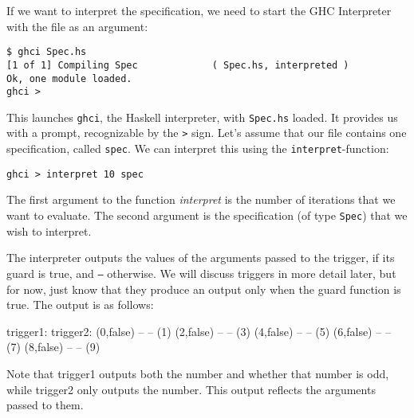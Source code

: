 If we want to interpret the specification, we need to start the GHC Interpreter with the file as an argument:
%
\begin{lstlisting}
$ ghci Spec.hs
[1 of 1] Compiling Spec             ( Spec.hs, interpreted )
Ok, one module loaded.
ghci > 
\end{lstlisting}
%
This launches \texttt{ghci}, the Haskell interpreter, with \texttt{Spec.hs}
loaded. It provides us with a prompt, recognizable by the \texttt{>} sign. Let's
assume that our file contains one specification, called \texttt{spec}. We can
interpret this using the \texttt{interpret}-function:
\begin{lstlisting}[language = Copilot]
ghci > interpret 10 spec
\end{lstlisting}
%
The first argument to the function \emph{interpret} is the number of iterations
that we want to evaluate. The second argument is the specification (of type
{\tt Spec}) that we wish to interpret.

The interpreter outputs the values of the arguments passed to the trigger, if
its guard is true, and {\tt --} otherwise. We will discuss triggers in more
detail later, but for now, just know that they produce an output only when the
guard function is true. The output is as follows:
%
\begin{code}
trigger1:   trigger2:
(0,false)  --
--         (1)
(2,false)  --
--         (3)
(4,false)  --
--         (5)
(6,false)  --
--         (7)
(8,false)  --
--         (9)
\end{code}
%

Note that trigger1 outputs both the number and whether that number is odd,
while trigger2 only outputs the number. This output reflects the arguments
	passed to them. 


